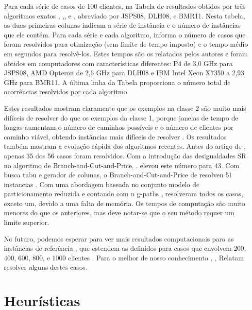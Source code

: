 
Para cada série de casos de 100 clientes, na Tabela de resultados obtidos por três algoritmos exatos , \cite{jepsen13},\cite{desaulniers14}, e \cite{baldacci11}, abreviado por JSPS08, DLH08, e BMR11. Nesta tabela, as duas primeiras colunas indicam a série de instância e o número de instâncias que ele contém. Para cada série e cada algoritmo, informa o número de casos que foram resolvidos para otimização (sem limite de tempo imposto) e o tempo médio em segundos para resolvê-los. Estes tempos são os relatados pelos autores e foram obtidos em computadores com características diferentes: P4 de 3,0 GHz para JSPS08, AMD Opteron de 2,6 GHz para DLH08 e IBM Intel Xeon X7350 a 2,93 GHz para BMR11. A última linha da Tabela proporciona o número total de ocorrências resolvidos por cada algoritmo.

Estes resultados mostram claramente que os exemplos na classe 2 são muito mais difíceis de resolver do que os exemplos da classe 1, porque janelas de tempo de longas aumentam o número de caminhos possíveis e o número de clientes por caminho viável, obtendo instâncias mais difíceis de resolver . Os resultados também mostram a evolução rápida dos algoritmos recentes. Antes do artigo de \cite{jepsen13}, apenas 35 dos 56 casos foram resolvidos. Com a introdução das desigualdades SR no algoritmo de Branch-and-Cut-and-Price, \cite{jepsen13}. elevou este número para 43. Com busca tabu e gerador de colunas, o Branch-and-Cut-and-Price de \cite{desaulniers14} resolveu 51 instancias . Com uma abordagem baseada no conjunto modelo de particionamento reduzida e contando com n g-paths , \cite{baldacci11} resolveram todos os casos, exceto um, devido a uma falta de memória. Os tempos de computação são muito menores do que os anteriores, mas deve notar-se que o seu método requer um limite superior.

No futuro, podemos esperar para ver mais resultados computacionais para as instâncias de referência \cite{gehring09}, que estendem as definidos para casos que envolvem 200, 400, 600, 800, e 1000 clientes . Para o melhor de nosso conhecimento \cite{larsen00},\cite{braysy02} \cite{cook99}, \cite{kallehauge06} Relatam resolver alguns destes casos.
 
\section{Heurísticas}

